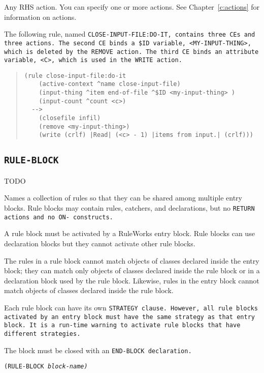 {{\begin{arguments}
  Any RHS action. You can specify one or more actions. See
  Chapter~\ref{c:actions} for information on actions.
\end{arguments}

\Example

The following rule, named \tt{CLOSE-INPUT-FILE:DO-IT}, contains three
CEs and three actions. The second CE binds a
\verb|$ID| variable, \verb|<MY-INPUT-THING>|, which is deleted by the
\tt{REMOVE} action. The third CE binds an attribute variable,
\verb|<C>|, which is used in the \tt{WRITE} action.

\begin{quote}
\begin{verbatim}
(rule close-input-file:do-it
    (active-context ^name close-input-file)
    (input-thing ^item end-of-file ^$ID <my-input-thing> )
    (input-count ^count <c>)
  -->
    (closefile infil)
    (remove <my-input-thing>)
    (write (crlf) |Read| (<c> - 1) |items from input.| (crlf)))
\end{verbatim}
\end{quote}

\subsection{\tt{RULE-BLOCK}}
TODO

Names a collection of rules so that they can be shared among multiple
entry blocks. Rule blocks may contain rules, catchers, and
declarations, but no \tt{RETURN} actions and no \tt{ON-} constructs.

A rule block must be activated by a RuleWorks entry block.  Rule
blocks can use declaration blocks but they cannot activate other rule
blocks.

The rules in a rule block cannot match objects of classes declared
inside the entry block; they can match only objects of classes
declared inside the rule block or in a declaration block used by the
rule block. Likewise, rules in the entry block cannot match objects of
classes declared inside the rule block.

Each rule block can have its own \tt{STRATEGY} clause. However, all rule
blocks activated by an entry block must have the same strategy as that
entry block. It is a run-time warning to activate rule blocks that
have different strategies.

The block must be closed with an \tt{END-BLOCK} declaration.

\Format

\tt{(RULE-BLOCK} \it{block-name}\tt)

}}
